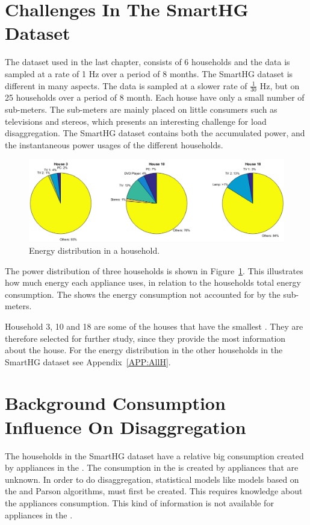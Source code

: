 \section{Challenges In The SmartHG Dataset} 
The  dataset used in the last chapter, consists of 6 households and the data is sampled at a rate of 1 Hz over a period of 8 months. The SmartHG dataset is different in many aspects. The data is sampled at a slower rate of $\frac{1}{30}$ Hz, but on 25 households over a period of 8 month. Each house have only a small number of sub-meters. The sub-meters are mainly placed on little consumers such as televisions and stereos, which presents an interesting challenge for load disaggregation. The SmartHG dataset contains both the accumulated power, and the instantaneous power usages of the different households.

\begin{figure}[H]
\centering
\includegraphics[width=1\textwidth]{billeder/TotalPie.png}
\caption{Energy distribution in a household.}
\label{fig:SLC}
\end{figure}

The power distribution of three households is shown in Figure~\ref{fig:SLC}. This illustrates how much energy each appliance uses, in relation to the households total energy consumption. The  shows the energy consumption not accounted for by the sub-meters.  

Household 3, 10 and 18 are some of the houses that have the smallest . They are therefore selected for further study, since they provide the most information about the house. For the energy distribution in the other households in the SmartHG dataset see Appendix~\ref{APP:AllH}. 

\section{Background Consumption Influence On Disaggregation}
\label{sec:AppNoise}
The households in the SmartHG dataset have a relative big consumption created by appliances in the . The consumption in the  is created by appliances that are unknown. In order to do disaggregation, statistical models like models based on the  and Parson algorithms, must first be created. This requires knowledge about the appliances consumption. This kind of information is not available for appliances in the . 

